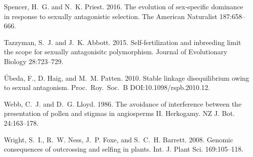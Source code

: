 \documentclass{article}
\begin{document}
\begin{thebibliography}{}
Spencer, H.~G. and N.~K. Priest. 2016.
\newblock The evolution of sex-specific dominance in response to sexually antagonistic selection.
\newblock The American Naturalist 187:658--666.

Tazzyman, S.~J. and J.~K. Abbott. 2015.
\newblock Self-fertilization and inbreeding limit the scope for sexually antagonisitc polymorphism.
\newblock Journal of Evolutionary Biology 28:723--729.

\'Ubeda, F., D. Haig, and M.~M. Patten. 2010.
\newblock Stable linkage disequilibrium owing to sexual antagonism.
\newblock Proc.~Roy.~Soc.~B DOI:10.1098/rspb.2010.12.

Webb, C.~J. and D.~G. Lloyd. 1986.
\newblock The avoidance of interference between the presentation of pollen and stigmas in angiosperms II. Herkogamy.
\newblock NZ J. Bot. 24:163--178.

Wright, S.~I., R.~W. Ness, J.~P. Foxe, and S.~C.~H. Barrett. 2008.
\newblock Genomic consequences of outcrossing and selfing in plants.
\newblock Int. J. Plant Sci. 169:105--118.


\end{thebibliography}
\end{document}
